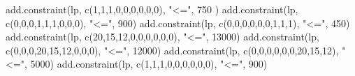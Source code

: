 \documentclass[
]{article}
\newenvironment{Shaded}{\begin{snugshade}}{\end{snugshade}}
\newcommand{\DecValTok}[1]{\textcolor[rgb]{0.00,0.00,0.81}{#1}}
\newcommand{\FunctionTok}[1]{\textcolor[rgb]{0.00,0.00,0.00}{#1}}
\newcommand{\NormalTok}[1]{#1}
\newcommand{\StringTok}[1]{\textcolor[rgb]{0.31,0.60,0.02}{#1}}
\begin{document}
\begin{Shaded}
\begin{Highlighting}[]
\FunctionTok{add.constraint}\NormalTok{(lp, }\FunctionTok{c}\NormalTok{(}\DecValTok{1}\NormalTok{,}\DecValTok{1}\NormalTok{,}\DecValTok{1}\NormalTok{,}\DecValTok{0}\NormalTok{,}\DecValTok{0}\NormalTok{,}\DecValTok{0}\NormalTok{,}\DecValTok{0}\NormalTok{,}\DecValTok{0}\NormalTok{,}\DecValTok{0}\NormalTok{), }\StringTok{"\textless{}="}\NormalTok{, }\DecValTok{750}\NormalTok{ )}
\FunctionTok{add.constraint}\NormalTok{(lp, }\FunctionTok{c}\NormalTok{(}\DecValTok{0}\NormalTok{,}\DecValTok{0}\NormalTok{,}\DecValTok{0}\NormalTok{,}\DecValTok{1}\NormalTok{,}\DecValTok{1}\NormalTok{,}\DecValTok{1}\NormalTok{,}\DecValTok{0}\NormalTok{,}\DecValTok{0}\NormalTok{,}\DecValTok{0}\NormalTok{), }\StringTok{"\textless{}="}\NormalTok{, }\DecValTok{900}\NormalTok{)}
\FunctionTok{add.constraint}\NormalTok{(lp, }\FunctionTok{c}\NormalTok{(}\DecValTok{0}\NormalTok{,}\DecValTok{0}\NormalTok{,}\DecValTok{0}\NormalTok{,}\DecValTok{0}\NormalTok{,}\DecValTok{0}\NormalTok{,}\DecValTok{0}\NormalTok{,}\DecValTok{1}\NormalTok{,}\DecValTok{1}\NormalTok{,}\DecValTok{1}\NormalTok{), }\StringTok{"\textless{}="}\NormalTok{, }\DecValTok{450}\NormalTok{)}
\FunctionTok{add.constraint}\NormalTok{(lp, }\FunctionTok{c}\NormalTok{(}\DecValTok{20}\NormalTok{,}\DecValTok{15}\NormalTok{,}\DecValTok{12}\NormalTok{,}\DecValTok{0}\NormalTok{,}\DecValTok{0}\NormalTok{,}\DecValTok{0}\NormalTok{,}\DecValTok{0}\NormalTok{,}\DecValTok{0}\NormalTok{,}\DecValTok{0}\NormalTok{), }\StringTok{"\textless{}="}\NormalTok{, }\DecValTok{13000}\NormalTok{)}
\FunctionTok{add.constraint}\NormalTok{(lp, }\FunctionTok{c}\NormalTok{(}\DecValTok{0}\NormalTok{,}\DecValTok{0}\NormalTok{,}\DecValTok{0}\NormalTok{,}\DecValTok{20}\NormalTok{,}\DecValTok{15}\NormalTok{,}\DecValTok{12}\NormalTok{,}\DecValTok{0}\NormalTok{,}\DecValTok{0}\NormalTok{,}\DecValTok{0}\NormalTok{), }\StringTok{"\textless{}="}\NormalTok{, }\DecValTok{12000}\NormalTok{)}
\FunctionTok{add.constraint}\NormalTok{(lp, }\FunctionTok{c}\NormalTok{(}\DecValTok{0}\NormalTok{,}\DecValTok{0}\NormalTok{,}\DecValTok{0}\NormalTok{,}\DecValTok{0}\NormalTok{,}\DecValTok{0}\NormalTok{,}\DecValTok{0}\NormalTok{,}\DecValTok{20}\NormalTok{,}\DecValTok{15}\NormalTok{,}\DecValTok{12}\NormalTok{), }\StringTok{"\textless{}="}\NormalTok{, }\DecValTok{5000}\NormalTok{)}
\FunctionTok{add.constraint}\NormalTok{(lp, }\FunctionTok{c}\NormalTok{(}\DecValTok{1}\NormalTok{,}\DecValTok{1}\NormalTok{,}\DecValTok{1}\NormalTok{,}\DecValTok{0}\NormalTok{,}\DecValTok{0}\NormalTok{,}\DecValTok{0}\NormalTok{,}\DecValTok{0}\NormalTok{,}\DecValTok{0}\NormalTok{,}\DecValTok{0}\NormalTok{), }\StringTok{"\textless{}="}\NormalTok{, }\DecValTok{900}\NormalTok{)}

\end{Highlighting}
\end{Shaded}
\end{document}
